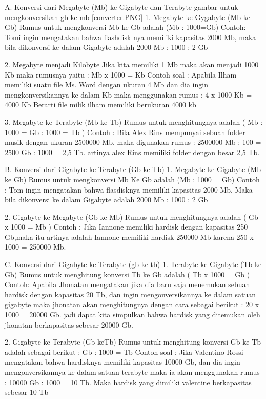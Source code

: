 A.	Konversi dari Megabyte (Mb) ke Gigabyte dan Terabyte
gambar untuk mengkonversikan gb ke mb \ref{converter.PNG}
1.	Megabyte ke Gygabyte (Mb ke Gb)
	Rumus untuk mengkonversi Mb ke Gb adalah (Mb : 1000=Gb)
	Contoh: 
	Tomi ingin mengatakan bahwa flashdisk nya memiliki kapasitas 2000 Mb, maka bila dikonversi  ke dalam Gigabyte adalah 2000 Mb : 1000 : 2 Gb 

2.	Megabyte menjadi Kilobyte
Jika kita memiliki 1 Mb maka akan menjadi 1000 Kb maka rumusnya yaitu :
Mb x 1000 = Kb
Contoh soal :
Apabila Ilham memiliki suatu file Ms. Word dengan ukuran 4 Mb dan dia ingin mengkonversikannya ke dalam Kb maka menggunakan rumus :
4 x 1000 Kb = 4000 Kb
Berarti file milik ilham memiliki berukuran 4000 kb

3.	Megabyte ke Terabyte (Mb ke Tb)
Rumus untuk menghitungnya adalah ( Mb : 1000 = Gb : 1000 = Tb )
Contoh :
Bila Alex Rins mempunyai sebuah folder musik dengan ukuran 2500000 Mb, maka digunakan rumus : 2500000 Mb : 100 = 2500 Gb : 1000 = 2,5 Tb.
artinya alex Rins memiliki folder dengan besar 2,5 Tb.

B.	Konversi dari Gigabyte ke Terabyte (Gb ke Tb)
1.	Megabyte ke Gigabyte (Mb ke Gb)
Rumus untuk mengkonversi Mb Ke Gb adalah (Mb : 1000 = Gb)
Contoh :
Tom ingin mengatakan bahwa flasdisknya memiliki kapasitas 2000 Mb, Maka bila dikonversi ke dalam Gigabyte adalah 2000 Mb : 1000 : 2 Gb

2.	Gigabyte ke Megabyte (Gb ke Mb)
Rumus untuk menghitungnya adalah ( Gb x 1000 = Mb )
Contoh :
Jika Iannone memiliki hardisk dengan kapasitas 250 Gb,maka itu artinya adalah Iannone memiliki hardisk 250000 Mb karena 250 x 1000 = 250000 Mb.

C. Konversi dari Gigabyte ke Terabyte (gb ke tb)
1. Terabyte ke Gigabyte (Tb ke Gb)
Rumus untuk menghitung konversi Tb ke Gb adalah ( Tb x 1000 = Gb )
Contoh:
Apabila Jhonatan mengatakan jika dia baru saja menemukan sebuah hardisk dengan kapasitas 20 Tb, dan ingin mengonversikannya ke dalam satuan gigabyte maka jhonatan akan menghitungnya dengan cara sebagai berikut :
20 x 1000 = 20000 Gb.
jadi dapat kita simpulkan bahwa  hardisk yang ditemukan oleh jhonatan berkapasitas sebesar 20000 Gb.

2.	Gigabyte ke Terabyte (Gb keTb)
Rumus untuk menghitung konversi Gb ke Tb  adalah sebagai berikut :
 Gb : 1000 = Tb
Contoh soal :
Jika Valentino Rossi mengatakan bahwa hardisknya memiliki kapasitas 10000 Gb, dan dia ingin mengonversikannya ke dalam satuan terabyte maka ia akan menggunakan rumus :
10000 Gb : 1000 = 10 Tb.
Maka hardisk yang dimiliki valentine berkapasitas sebesar 10 Tb

